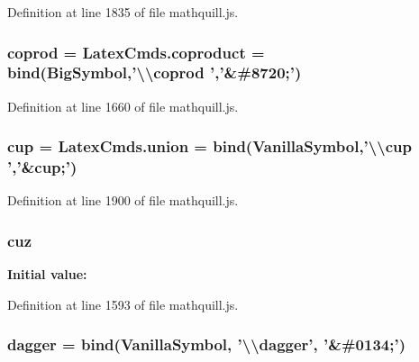 Definition at line 1835 of file mathquill.\-js.

\subsubsection[{coprod}]{ coprod = Latex\-Cmds.\-coproduct = {\bf bind}({\bf Big\-Symbol},'\textbackslash{}\textbackslash{}coprod ','\&\#8720;')}\label{mathquill_8js_ab780863b0b6c580594c74352db1bf679}


Definition at line 1660 of file mathquill.\-js.

\subsubsection[{cup}]{ cup = Latex\-Cmds.\-union = {\bf bind}({\bf Vanilla\-Symbol},'\textbackslash{}\textbackslash{}cup ','\&cup;')}\label{mathquill_8js_a2d9c1ebf7a8417c6bb0e3ae7ffac5e1d}


Definition at line 1900 of file mathquill.\-js.

\subsubsection[{cuz}]{ cuz}\label{mathquill_8js_aae131de4435ac56da8dd9f2af8f895f1}
{\bfseries Initial value\-:}


Definition at line 1593 of file mathquill.\-js.

\subsubsection[{dagger}]{ dagger = {\bf bind}({\bf Vanilla\-Symbol}, '\textbackslash{}\textbackslash{}dagger', '\&\#0134;')}\label{mathquill_8js_a5598760fa5c5fb4214c74a4eee15bb4c}


